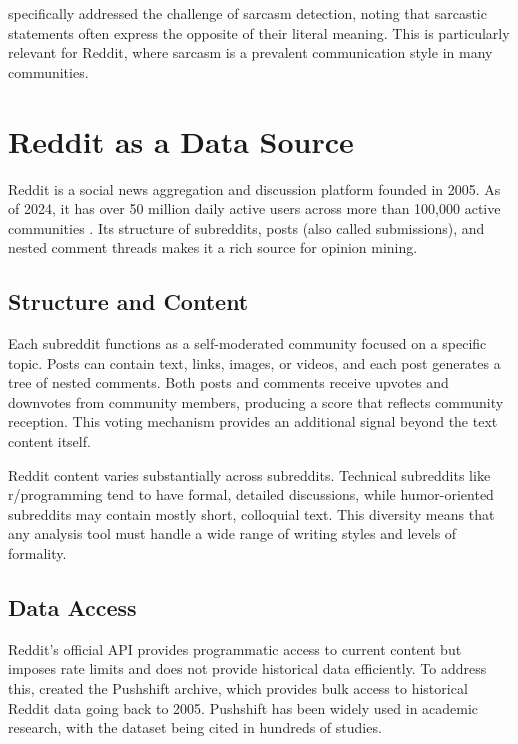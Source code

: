  specifically addressed the challenge of sarcasm detection, noting that sarcastic statements often express the opposite of their literal meaning. This is particularly relevant for Reddit, where sarcasm is a prevalent communication style in many communities.

\section{Reddit as a Data Source}
\label{sec:reddit_data_source}

Reddit is a social news aggregation and discussion platform founded in 2005. As of 2024, it has over 50 million daily active users across more than 100,000 active communities \cite{reddit2024statistics}. Its structure of subreddits, posts (also called submissions), and nested comment threads makes it a rich source for opinion mining.

\subsection{Structure and Content}

Each subreddit functions as a self-moderated community focused on a specific topic. Posts can contain text, links, images, or videos, and each post generates a tree of nested comments. Both posts and comments receive upvotes and downvotes from community members, producing a score that reflects community reception. This voting mechanism provides an additional signal beyond the text content itself.

Reddit content varies substantially across subreddits. Technical subreddits like r/programming tend to have formal, detailed discussions, while humor-oriented subreddits may contain mostly short, colloquial text. This diversity means that any analysis tool must handle a wide range of writing styles and levels of formality.

\subsection{Data Access}

Reddit's official API provides programmatic access to current content but imposes rate limits and does not provide historical data efficiently. To address this,  created the Pushshift archive, which provides bulk access to historical Reddit data going back to 2005. Pushshift has been widely used in academic research, with the dataset being cited in hundreds of studies.

